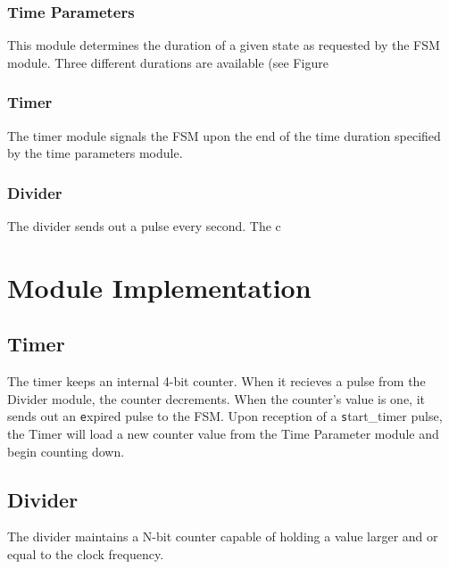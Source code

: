\documentclass{article}
\begin{document}
		\subsubsection{Time Parameters}
			This module determines the duration of a given state
			as requested by the FSM module.  Three different
			durations are available (see Figure 

		\subsubsection{Timer}
			The timer module signals the FSM upon the end of the
			time duration specified by the time parameters module.

		\subsubsection{Divider}
			The divider sends out a pulse every second.  The c

\section{Module Implementation}
	\subsection{Timer}
		The timer keeps an internal 4-bit counter.  When it recieves a
		pulse from the Divider module, the counter decrements.  When
		the counter's value is one, it sends out an {\texttt expired}
		pulse to the FSM.  Upon reception of a {\texttt start\_timer}
		pulse, the Timer will load a new counter value from the Time
		Parameter module and begin counting down.

	\subsection{Divider}
		The divider maintains a N-bit counter capable of holding a
		value larger and or equal to the clock frequency.
\end{document}
